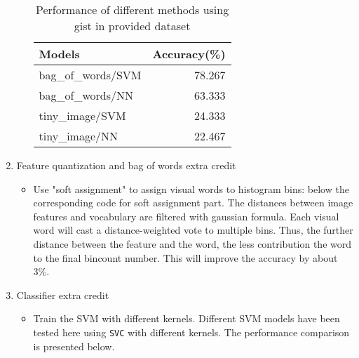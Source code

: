 \begin{enumerate}
\begin{itemize}
\begin{table}[h]
\begin{tabular}{lr}
                            \toprule
                            Models             & Accuracy(\%) \\
                            \midrule
                            bag\_of\_words/SVM & 78.267       \\
                            bag\_of\_words/NN  & 63.333       \\
                            tiny\_image/SVM    & 24.333       \\
                            tiny\_image/NN     & 22.467       \\
                            \bottomrule
                        \end{tabular}
                        \caption{Performance of different methods using gist in provided dataset}
                        \label{multi_descriptor}
                    \end{table}
          \end{itemize}
    \item Feature quantization and bag of words extra credit
          \begin{itemize}
              \item Use "soft assignment" to assign visual words to histogram bins: below the corresponding code for soft assignment part. The distances between image features and vocabulary are filtered with gaussian formula. Each visual word will cast a distance-weighted vote to multiple bins. Thus, the further distance between the feature and the word, the less contribution the word to the final bincount number. This will improve the accuracy by about 3\%.
          \end{itemize}
    \item Classifier extra credit
          \begin{itemize}
              \item Train the SVM with different kernels. Different SVM models have been tested here using \verb|SVC| with different kernels. The performance comparison is presented below.
                    \begin{table}[h]

\end{table}
\end{itemize}
\end{enumerate}
